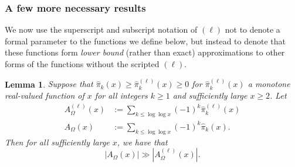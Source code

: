 \documentclass[11pt,reqno,a4letter]{article}
\numberwithin{figure}{section}
\numberwithin{table}{section}
\theoremstyle{plain}
\newtheorem{lemma}[theorem]{Lemma}
\numberwithin{theorem}{section}
\theoremstyle{definition}
\begin{document}
\subsubsection{A few more necessary results} 
\label{subsubSection_RoutineProofsNeededForMainBoundOnGInvxFunc} 

We now use the superscript and subscript notation of 
$(\ell)$ not to denote a formal parameter to 
the functions we define below, but instead to denote that these functions form 
\emph{lower bound} (rather than exact) 
approximations to other forms of the functions without the scripted $(\ell)$. 

\begin{lemma} 
\label{lemma_lowerBoundsOnLambdaFuncParitySummFuncs} 
Suppose that $\widehat{\pi}_k(x) \geq \widehat{\pi}_k^{(\ell)}(x) \geq 0$ 
for $\widehat{\pi}_k^{(\ell)}(x)$ a monotone real-valued function of $x$ 
for all integers $k \geq 1$ and sufficiently large $x \geq 2$. 
Let 
\begin{align*} 
A_{\Omega}^{(\ell)}(x) & := \sum_{k \leq \log\log x} (-1)^k \widehat{\pi}_k^{(\ell)}(x) \\ 
A_{\Omega}(x) & := \sum_{k \leq \log\log x} (-1)^k \widehat{\pi}_k(x). 
\end{align*} 
Then for all sufficiently large $x$, we have that 
$$|A_{\Omega}(x)| \gg |A_{\Omega}^{(\ell)}(x)|.$$ 
\end{lemma} 
\end{document}
